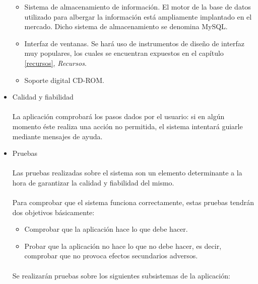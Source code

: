 \begin{itemize}
   \begin{itemize}
      \item Sistema de almacenamiento de información. El motor de la base de
      datos utilizado para albergar la información está ampliamente implantado
      en el mercado. Dicho sistema de almacenamiento se denomina MySQL.
      \item Interfaz de ventanas. Se hará uso de instrumentos de diseño de
      interfaz muy populares, los cuales se encuentran expuestos en el capítulo
      \ref{recursos}, \textit{Recursos}.
      \item Soporte digital CD-ROM.
   \end{itemize}


 \item Calidad y fiabilidad

   \paragraph{}La aplicación comprobará los pasos dados por el usuario: si en
   algún momento éste realiza una acción no permitida, el sistema intentará
   guiarle mediante mensajes de ayuda.

 \item Pruebas

   \paragraph{}Las pruebas realizadas sobre el sistema son un elemento
   determinante a la hora de garantizar la calidad y fiabilidad del mismo.

   \paragraph{}Para comprobar que el sistema funciona correctamente, estas
   pruebas tendrán dos objetivos básicamente:

   \begin{itemize}
      \item Comprobar que la aplicación hace lo que debe hacer.
      \item Probar que la aplicación no hace lo que no debe hacer, es decir,
      comprobar que no provoca efectos secundarios adversos.
   \end{itemize}

   \paragraph{}Se realizarán pruebas sobre los siguientes subsistemas de la
   aplicación:


\end{itemize}
